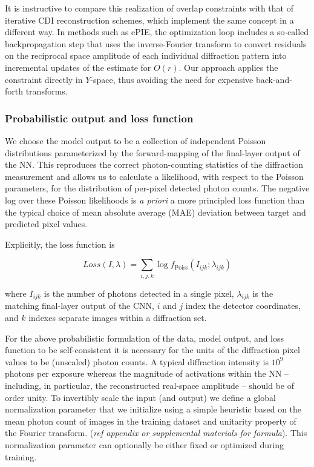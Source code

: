 \documentclass[sn-mathphys]{sn-jnl}%
\theoremstyle{thmstyleone}%
\theoremstyle{thmstyletwo}%
\theoremstyle{thmstylethree}%
\begin{document}
It is instructive to compare this realization of overlap constraints with that of iterative CDI reconstruction schemes, which implement the same concept in a different way. In methods such as ePIE, the optimization loop includes a so-called backpropagation step that uses the inverse-Fourier transform to convert residuals on the reciprocal space amplitude of each individual diffraction pattern into incremental updates of the estimate for $O(r)$. \cite{ePIE} Our approach applies the constraint directly in $Y$-space, thus avoiding the need for expensive back-and-forth transforms. 


\subsubsection{Probabilistic output and loss function}
We choose the model output to be a collection of independent Poisson distributions parameterized by the forward-mapping of the final-layer output of the NN. This reproduces the correct photon-counting statistics of the diffraction measurement and allows us to calculate a likelihood, with respect to the Poisson parameters, for the distribution of per-pixel detected photon counts. The negative log over these Poisson likelihoods is \emph{a priori} a more principled loss function than the typical choice of mean absolute average (MAE) deviation between target and predicted pixel values.

Explicitly, the loss function is

$$
Loss(I, \lambda) = \sum_{i,j,k}\log f_{\text{Poiss}}(I_{ijk};\lambda_{ijk})
$$


where $I_{ijk}$ is the number of photons detected in a single pixel, $\lambda_{ijk}$ is the matching final-layer output of the CNN, $i$ and $j$ index the detector coordinates, and $k$ indexes separate images within a diffraction set. 

For the above probabilistic formulation of the data, model output, and loss function to be self-consistent it is necessary for the units of the diffraction pixel values to be (unscaled) photon counts. A typical diffraction intensity is $10^9$ photons per exposure whereas the magnitude of activations within the NN -- including, in particular, the reconstructed real-space amplitude -- should be of order unity. To invertibly scale the input (and output) we define a global normalization parameter that we initialize using a simple heuristic based on the mean photon count of images in the training dataset and unitarity property of the Fourier transform. (\emph{ref appendix or supplemental materials for formula}). This normalization parameter can optionally be either fixed or optimized during training. 
\end{document}
